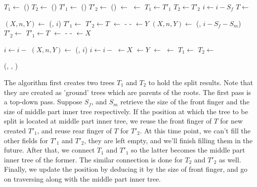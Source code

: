 \documentclass[UTF8]{article}
\begin{document}
\begin{algorithmic}
  \State $T_1 \gets$ ()
  \State $T_2 \gets$ ()
   
    \State $T'_1 \gets$ ()
    \State $T'_2 \gets$ ()
    \State {} $\gets$ 
    \State {} $\gets$ 
    \State {}
    \State {}
    \State $T_1 \gets T'_1$
    \State $T_2 \gets T'_2$
    \State $i \gets i - S_f$
    \State $T \gets$ 
  \EndWhile

    \State $(X, n, Y) \gets$ (, $i$)
    \State $T'_1 \gets$ 
    \State $T'_2 \gets T$
    \State {} $\gets$  -  - 
    \State {} $\gets Y$
    \State $(X, n, Y) \gets$ (, $i - S_f - S_m$)
    \State $T'_2 \gets$ 
    \State $T'_1 \gets T$
    \State {} $\gets$  -  - 
    \State {} $\gets X$
  \EndIf
  \State {}
  \State {}

  \State $i \gets i -$ 
   
    \State $(X, n, Y) \gets$ (, $i$)
    \State $i \gets i -$ 
    \State {} $\gets X$
    \State {} $\gets Y$
    \State {} $\gets$ 
    \State {} $\gets$ 
    \State $T_1 \gets$ 
    \State $T_2 \gets$ 
  \EndWhile

  \State \Return (, , )
\EndFunction
\end{algorithmic}

The algorithm first creates two trees $T_1$ and $T_2$ to hold the split results. Note that
they are created as 'ground' trees which are parents of the roots. The first pass is
a top-down pass. Suppose $S_f$, and $S_m$ retrieve the size of the front finger and the size of middle part
inner tree respectively. If the position at which the tree to be split is located at middle part inner tree,
we reuse the front finger of $T$ for new created $T'_1$, and reuse rear finger of $T$ for $T'_2$.
At this time point, we can't fill the other fields for $T'_1$ and $T'_2$, they are left empty, and
we'll finish filling them in the future. After that, we connect $T_1$ and $T'_1$ so the latter becomes
the middle part inner tree of the former. The similar connection is done for $T_2$ and $T'_2$ as well.
Finally, we update the position by deducing it by the size of front finger, and go on traversing along
with the middle part inner tree.
\end{document}

